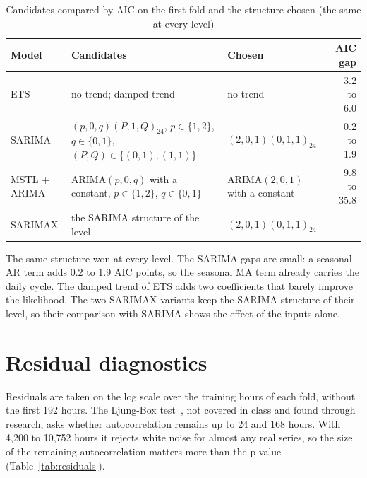 \documentclass[12pt,a4paper,openany]{report}
\begin{document}
\begin{table}[!htb]
  \centering\small
  \caption{Candidates compared by AIC on the first fold and the structure chosen (the same at every level)}
  \label{tab:structures}
  \begin{tabularx}{\textwidth}{>{\raggedright\arraybackslash}p{2.5cm}L>{\raggedright\arraybackslash}p{3.4cm}r}
    \toprule
    Model & Candidates & Chosen & AIC gap \\
    \midrule
    \ac{ETS} & no trend; damped trend & no trend & 3.2 to 6.0 \\
    \ac{SARIMA} & $(p,0,q)(P,1,Q)_{24}$, $p \in \{1,2\}$, $q \in \{0,1\}$, $(P,Q) \in \{(0,1),(1,1)\}$ & $(2,0,1)(0,1,1)_{24}$ & 0.2 to 1.9 \\
    \ac{MSTL} + \ac{ARIMA} & $\text{ARIMA}(p,0,q)$ with a constant, $p \in \{1,2\}$, $q \in \{0,1\}$ & $\text{ARIMA}(2,0,1)$ with a constant & 9.8 to 35.8 \\
    \ac{SARIMAX} & the \ac{SARIMA} structure of the level & $(2,0,1)(0,1,1)_{24}$ & -- \\
    \bottomrule
  \end{tabularx}
\end{table}

The same structure won at every level. The \ac{SARIMA} gaps are small: a seasonal AR term adds 0.2 to 1.9 \ac{AIC}
points, so the seasonal MA term already carries the daily cycle. The damped trend of \ac{ETS} adds two coefficients
that barely improve the likelihood. The two \ac{SARIMAX} variants keep the \ac{SARIMA} structure of their level, so
their comparison with \ac{SARIMA} shows the effect of the inputs alone.

\section{Residual diagnostics}\label{sec:diagnostics}

Residuals are taken on the log scale over the training hours of each fold, without the first 192 hours. The
Ljung-Box test~\cite{ljungbox1978}, not covered in class and found through research, asks whether autocorrelation
remains up to 24 and 168 hours. With 4,200 to 10,752 hours it rejects white noise for almost any real series, so the
size of the remaining autocorrelation matters more than the p-value~\cite[Section 5.4]{fpp3}
(Table~\ref{tab:residuals}).
\end{document}
